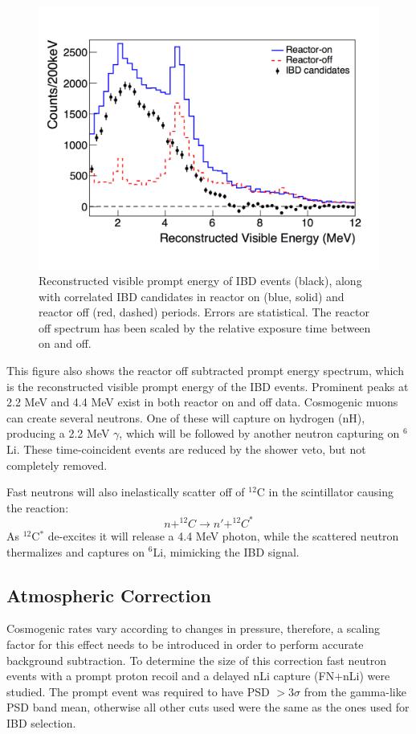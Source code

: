 \begin{figure}[!b]
	\centering
	\includegraphics[width=0.8\linewidth]{tex/7-oscillation-images/Spectrum}
	\caption{Reconstructed visible prompt energy of IBD events (black), along with correlated IBD candidates in reactor on (blue, solid) and reactor off (red, dashed) periods. Errors are statistical. The reactor off spectrum has been scaled by the relative exposure time between on and off. \cite{Ashenfelter:2018jrx}}
	\label{fig:spectrumresults}
\end{figure}

This figure also shows the reactor off subtracted prompt energy spectrum, which is the reconstructed visible prompt energy of the IBD events.
Prominent peaks at 2.2 MeV and 4.4 MeV exist in both reactor on and off data.
Cosmogenic muons can create several neutrons. One of these will capture on hydrogen (nH), producing a 2.2 MeV $\gamma$, which will be followed by another neutron capturing on $^6$Li. 
These time-coincident events are reduced by the shower veto, but not completely removed.

Fast neutrons will also inelastically scatter off of $^{12}$C in the scintillator causing the reaction:
\begin{equation}
	n + ^{12}C \rightarrow n' + ^{12}C^*
\end{equation}
As $^{12}$C$^*$ de-excites it will release a 4.4 MeV photon, while the scattered neutron thermalizes and captures on $^{6}$Li, mimicking the IBD signal.


\subsection{Atmospheric Correction}

Cosmogenic rates vary according to changes in pressure, therefore, a scaling factor for this effect needs to be introduced in order to perform accurate background subtraction.
To determine the size of this correction fast neutron events with a prompt proton recoil and a delayed nLi capture (FN+nLi) were studied. 
The prompt event was required to have PSD $>3\sigma$ from the gamma-like PSD band mean, otherwise all other cuts used were the same as the ones used for IBD selection.

